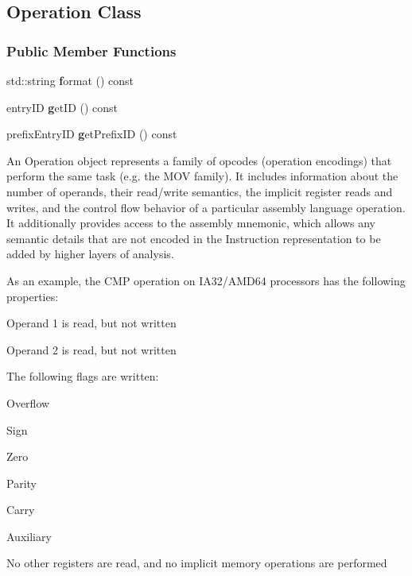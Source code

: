 \subsection{Operation Class}
\label{classDyninst_1_1InstructionAPI_1_1Operation}
\subsubsection*{Public Member Functions}
\begin{DoxyCompactItemize}
\item 
 std::string {\textbf format} () const 
\item 
 entryID {\textbf getID} () const 
\item 
 prefixEntryID {\textbf getPrefixID} () const 
\end{DoxyCompactItemize}



An Operation object represents a family of opcodes (operation encodings) that perform the same task (e.g. the {\ttfamily MOV} family). It includes information about the number of operands, their read/write semantics, the implicit register reads and writes, and the control flow behavior of a particular assembly language operation. It additionally provides access to the assembly mnemonic, which allows any semantic details that are not encoded in the Instruction representation to be added by higher layers of analysis.

As an example, the {\ttfamily CMP} operation on IA32/AMD64 processors has the following properties:
\begin{DoxyItemize}
\item Operand 1 is read, but not written
\item Operand 2 is read, but not written
\item The following flags are written:
\begin{DoxyItemize}
\item Overflow
\item Sign
\item Zero
\item Parity
\item Carry
\item Auxiliary
\end{DoxyItemize}
\item No other registers are read, and no implicit memory operations are performed
\end{DoxyItemize}

